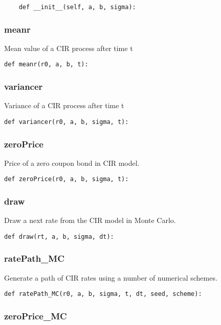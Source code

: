 \documentclass[twoside,11pt]{book}
\begin{document}
\begin{lstlisting}
    def __init__(self, a, b, sigma):
\end{lstlisting}

\subsubsection*{{\bf meanr}}
Mean value of a CIR process after time t  

\begin{lstlisting}
def meanr(r0, a, b, t):
\end{lstlisting}

\subsubsection*{{\bf variancer}}
Variance of a CIR process after time t  

\begin{lstlisting}
def variancer(r0, a, b, sigma, t):
\end{lstlisting}

\subsubsection*{{\bf zeroPrice}}
Price of a zero coupon bond in CIR model.  

\begin{lstlisting}
def zeroPrice(r0, a, b, sigma, t):
\end{lstlisting}

\subsubsection*{{\bf draw}}
Draw a next rate from the CIR model in Monte Carlo.  

\begin{lstlisting}
def draw(rt, a, b, sigma, dt):
\end{lstlisting}

\subsubsection*{{\bf ratePath\_MC}}
Generate a path of CIR rates using a number of numerical schemes.  

\begin{lstlisting}
def ratePath_MC(r0, a, b, sigma, t, dt, seed, scheme):
\end{lstlisting}

\subsubsection*{{\bf zeroPrice\_MC}}
\end{document}
